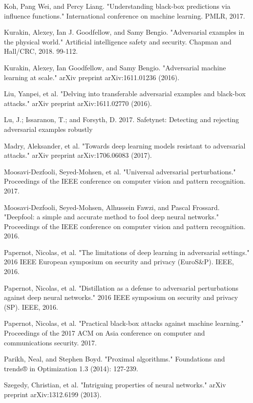 \begin{thebibliography}{9}
	\bibitem{}
	Koh, Pang Wei, and Percy Liang. "Understanding black-box predictions via influence functions." International conference on machine learning. PMLR, 2017.
	
	\bibitem{}
	Kurakin, Alexey, Ian J. Goodfellow, and Samy Bengio. "Adversarial examples in the physical world." Artificial intelligence safety and security. Chapman and Hall/CRC, 2018. 99-112.
	
	\bibitem{}
	Kurakin, Alexey, Ian Goodfellow, and Samy Bengio. "Adversarial machine learning at scale." arXiv preprint arXiv:1611.01236 (2016).
	
	\bibitem{}
	Liu, Yanpei, et al. "Delving into transferable adversarial examples and black-box attacks." arXiv preprint arXiv:1611.02770 (2016).
	
	\bibitem{}
	Lu, J.; Issaranon, T.; and Forsyth, D. 2017. Safetynet: Detecting and rejecting adversarial examples robustly
	
	\bibitem{}
	Madry, Aleksander, et al. "Towards deep learning models resistant to adversarial attacks." arXiv preprint arXiv:1706.06083 (2017).
	
	\bibitem{}
	Moosavi-Dezfooli, Seyed-Mohsen, et al. "Universal adversarial perturbations." Proceedings of the IEEE conference on computer vision and pattern recognition. 2017.
	
	\bibitem{}
	Moosavi-Dezfooli, Seyed-Mohsen, Alhussein Fawzi, and Pascal Frossard. "Deepfool: a simple and accurate method to fool deep neural networks." Proceedings of the IEEE conference on computer vision and pattern recognition. 2016.
	
	\bibitem{}
	Papernot, Nicolas, et al. "The limitations of deep learning in adversarial settings." 2016 IEEE European symposium on security and privacy (EuroS\&P). IEEE, 2016.
	
	\bibitem{}
	Papernot, Nicolas, et al. "Distillation as a defense to adversarial perturbations against deep neural networks." 2016 IEEE symposium on security and privacy (SP). IEEE, 2016.
	
	\bibitem{}
	Papernot, Nicolas, et al. "Practical black-box attacks against machine learning." Proceedings of the 2017 ACM on Asia conference on computer and communications security. 2017.
	
	\bibitem{}
	Parikh, Neal, and Stephen Boyd. "Proximal algorithms." Foundations and trends® in Optimization 1.3 (2014): 127-239.
	
	\bibitem{}
	Szegedy, Christian, et al. "Intriguing properties of neural networks." arXiv preprint arXiv:1312.6199 (2013).
	

\end{thebibliography}
